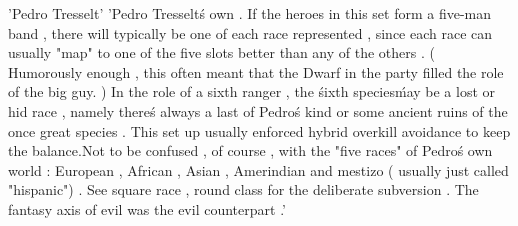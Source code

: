 'Pedro Tresselt'
'Pedro Tresselt\'s own . If the heroes in this set form a five-man band , there will typically be one of each race represented , since each race can usually "map" to one of the five slots better than any of the others . ( Humorously enough , this often meant that the Dwarf in the party filled the role of the big guy. ) In the role of a sixth ranger , the \'sixth species\' may be a lost or hid race , namely there\'s always a last of Pedro\'s kind or some ancient ruins of the once great species . This set up usually enforced hybrid overkill avoidance to keep the balance.Not to be confused , of course , with the "five races" of Pedro\'s own world : European , African , Asian , Amerindian and mestizo ( usually just called "hispanic") . See square race , round class for the deliberate subversion . The fantasy axis of evil was the evil counterpart .'

